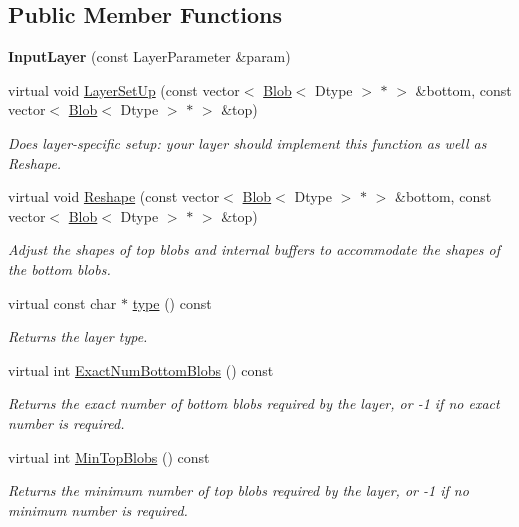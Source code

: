 \subsection*{Public Member Functions}
\begin{DoxyCompactItemize}
\item 
{\bfseries Input\+Layer} (const Layer\+Parameter \&param)\hypertarget{classcaffe_1_1InputLayer_af95727fa25481ed69eb93fb05336e4d8}{}\label{classcaffe_1_1InputLayer_af95727fa25481ed69eb93fb05336e4d8}

\item 
virtual void \hyperlink{classcaffe_1_1InputLayer_afafb49133e9d87ce6f67fc4a12ca1fb3}{Layer\+Set\+Up} (const vector$<$ \hyperlink{classcaffe_1_1Blob}{Blob}$<$ Dtype $>$ $\ast$ $>$ \&bottom, const vector$<$ \hyperlink{classcaffe_1_1Blob}{Blob}$<$ Dtype $>$ $\ast$ $>$ \&top)
\begin{DoxyCompactList}\small\item\em Does layer-\/specific setup\+: your layer should implement this function as well as Reshape. \end{DoxyCompactList}\item 
virtual void \hyperlink{classcaffe_1_1InputLayer_aae5f93f3456b0392d6145ae8c2d7d98e}{Reshape} (const vector$<$ \hyperlink{classcaffe_1_1Blob}{Blob}$<$ Dtype $>$ $\ast$ $>$ \&bottom, const vector$<$ \hyperlink{classcaffe_1_1Blob}{Blob}$<$ Dtype $>$ $\ast$ $>$ \&top)
\begin{DoxyCompactList}\small\item\em Adjust the shapes of top blobs and internal buffers to accommodate the shapes of the bottom blobs. \end{DoxyCompactList}\item 
virtual const char $\ast$ \hyperlink{classcaffe_1_1InputLayer_a809104dd51ae8c0343ddd9027f0392d1}{type} () const \hypertarget{classcaffe_1_1InputLayer_a809104dd51ae8c0343ddd9027f0392d1}{}\label{classcaffe_1_1InputLayer_a809104dd51ae8c0343ddd9027f0392d1}

\begin{DoxyCompactList}\small\item\em Returns the layer type. \end{DoxyCompactList}\item 
virtual int \hyperlink{classcaffe_1_1InputLayer_a5bb058da95fd98a74385bbd3eccbe56b}{Exact\+Num\+Bottom\+Blobs} () const 
\begin{DoxyCompactList}\small\item\em Returns the exact number of bottom blobs required by the layer, or -\/1 if no exact number is required. \end{DoxyCompactList}\item 
virtual int \hyperlink{classcaffe_1_1InputLayer_a32e355fd419a6144aedf3a91843a8089}{Min\+Top\+Blobs} () const 
\begin{DoxyCompactList}\small\item\em Returns the minimum number of top blobs required by the layer, or -\/1 if no minimum number is required. \end{DoxyCompactList}\end{DoxyCompactItemize}
